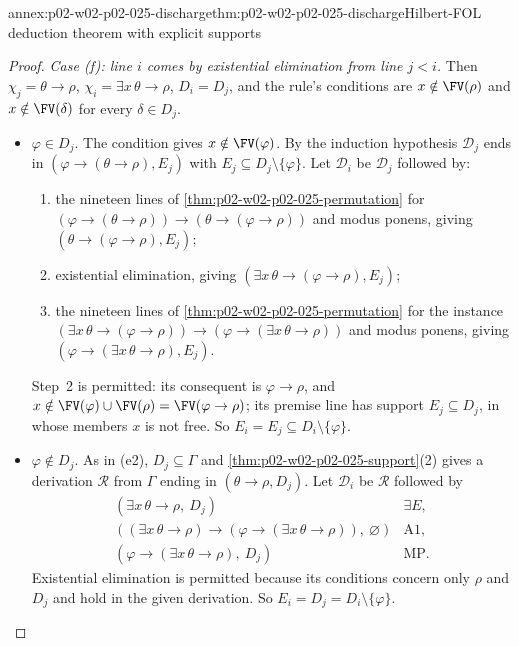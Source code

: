 \begin{annexitem}{annex:p02-w02-p02-025-discharge}{thm:p02-w02-p02-025-discharge}{Hilbert-FOL deduction theorem with explicit supports}
\begin{proof}
\emph{Case (f): line \(i\) comes by existential elimination from line
\(j<i\).}  Then \(\chi_j=\theta\to\rho\), \(\chi_i=\exists x\,\theta\to\rho\),
\(D_i=D_j\), and the rule's conditions are \(x\notin\FV(\rho)\) and
\(x\notin\FV(\delta)\) for every \(\delta\in D_j\).
\begin{itemize}
  \item[(f1)] \(\varphi\in D_j\).  The condition gives
        \(x\notin\FV(\varphi)\).  By the induction hypothesis
        \(\mathcal D_j\) ends in \((\varphi\to(\theta\to\rho),E_j)\) with
        \(E_j\subseteq D_j\setminus\{\varphi\}\).  Let \(\mathcal D_i\) be
        \(\mathcal D_j\) followed by:
        \begin{enumerate}
          \item the nineteen lines of \cref{thm:p02-w02-p02-025-permutation}
                for \((\varphi\to(\theta\to\rho))\to(\theta\to(\varphi\to\rho))\)
                and modus ponens, giving
                \((\theta\to(\varphi\to\rho),E_j)\);
          \item existential elimination, giving
                \((\exists x\,\theta\to(\varphi\to\rho),E_j)\);
          \item the nineteen lines of \cref{thm:p02-w02-p02-025-permutation}
                for the instance
                \((\exists x\,\theta\to(\varphi\to\rho))\to
                (\varphi\to(\exists x\,\theta\to\rho))\) and modus ponens,
                giving \((\varphi\to(\exists x\,\theta\to\rho),E_j)\).
        \end{enumerate}
        Step~2 is permitted: its consequent is \(\varphi\to\rho\), and
        \(x\notin\FV(\varphi)\cup\FV(\rho)=\FV(\varphi\to\rho)\); its premise
        line has support \(E_j\subseteq D_j\), in whose members \(x\) is not
        free.  So \(E_i=E_j\subseteq D_i\setminus\{\varphi\}\).
  \item[(f2)] \(\varphi\notin D_j\).  As in (e2),
        \(D_j\subseteq\Gamma\) and \cref{thm:p02-w02-p02-025-support}(2)
        gives a derivation \(\mathcal R\) from \(\Gamma\) ending in
        \((\theta\to\rho,D_j)\).  Let \(\mathcal D_i\) be \(\mathcal R\)
        followed by
        \[
        \begin{array}{ll}
          (\exists x\,\theta\to\rho,\ D_j) & \exists E,\\
          ((\exists x\,\theta\to\rho)\to(\varphi\to(\exists x\,\theta\to\rho)),\
            \varnothing) & \text{A1},\\
          (\varphi\to(\exists x\,\theta\to\rho),\ D_j) & \text{MP}.
        \end{array}
        \]
        Existential elimination is permitted because its conditions concern
        only \(\rho\) and \(D_j\) and hold in the given derivation.  So
        \(E_i=D_j=D_i\setminus\{\varphi\}\).
\end{itemize}


\end{proof}
\end{annexitem}
